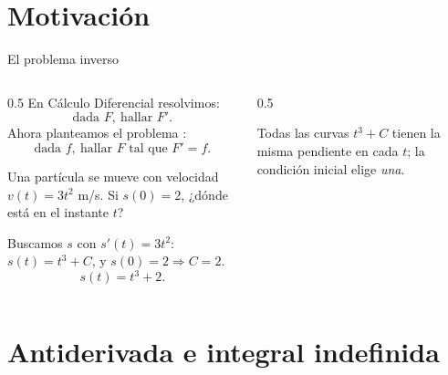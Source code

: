\documentclass[10pt,aspectratio=169]{beamer}
\begin{document}
\section{Motivación}

\begin{frame}{El problema inverso}
  \begin{columns}
    \begin{column}{0.5\textwidth}
      En Cálculo Diferencial resolvimos:
      \[ \text{dada } F,\ \text{hallar } F'. \]
      Ahora planteamos el problema :
      \[ \text{dada } f,\ \text{hallar } F \text{ tal que } F' = f. \]
      \begin{ejemplo}[(Física)]
        Una partícula se mueve con velocidad $v(t)=3t^2$ m/s. Si $s(0)=2$,
        ¿dónde está en el instante $t$?

        Buscamos $s$ con $s'(t)=3t^2$: \ $s(t)=t^3+C$, y $s(0)=2\Rightarrow C=2$.
        \[ s(t)=t^3+2. \]
      \end{ejemplo}
    \end{column}
    \begin{column}{0.5\textwidth}
      \centering

      \small Todas las curvas $t^3+C$ tienen la misma pendiente en cada $t$;
      la condición inicial elige \emph{una}.
    \end{column}
  \end{columns}
\end{frame}

\section{Antiderivada e integral indefinida}
\end{document}
